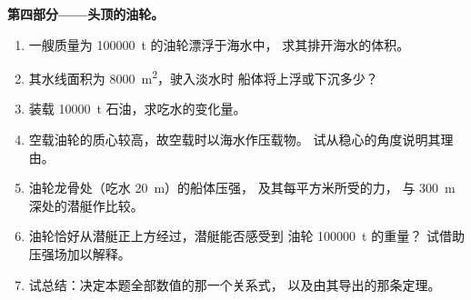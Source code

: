 \begin{problem}
\medskip
\noindent\textbf{第四部分——头顶的油轮。}
\begin{enumerate}[resume]
  \item 一艘质量为 \qty{100000}{t} 的油轮漂浮于海水中，
        求其排开海水的体积。
  \item 其水线面积为 \qty{8000}{m^2}，驶入淡水时
        船体将上浮或下沉多少？
  \item 装载 \qty{10000}{t} 石油，求吃水的变化量。
  \item 空载油轮的质心较高，故空载时以海水作压载物。
        试从稳心的角度说明其理由。
  \item 油轮龙骨处（吃水 \qty{20}{m}）的船体压强，
        及其每平方米所受的力，
        与 \qty{300}{m} 深处的潜艇作比较。
  \item 油轮恰好从潜艇正上方经过，潜艇能否感受到
        油轮 \qty{100000}{t} 的重量？
        试借助压强场加以解释。
  \item 试总结：决定本题全部数值的那一个关系式，
        以及由其导出的那条定理。
\end{enumerate}
\end{problem}
